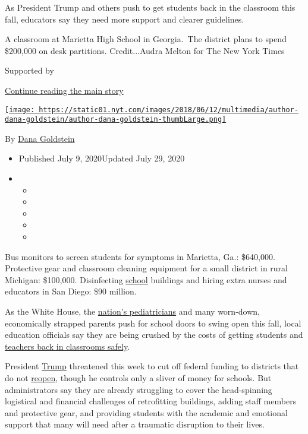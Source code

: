 As President Trump and others push to get students back in the classroom
this fall, educators say they need more support and clearer guidelines.

A classroom at Marietta High School in Georgia.~The district plans to
spend \$200,000 on desk partitions. Credit...Audra Melton for The New
York Times

Supported by

\protect\hyperlink{after-sponsor}{Continue reading the main story}

\href{https://www.nytimes.com/by/dana-goldstein}{\texttt{[image: https://static01.nyt.com/images/2018/06/12/multimedia/author-dana-goldstein/author-dana-goldstein-thumbLarge.png]}}

By \href{https://www.nytimes.com/by/dana-goldstein}{Dana Goldstein}

\begin{itemize}
\item
  Published July 9, 2020Updated July 29, 2020
\item
  \begin{itemize}
  \item
  \item
  \item
  \item
  \item
  \end{itemize}
\end{itemize}

Bus monitors to screen students for symptoms in Marietta, Ga.:
\$640,000. Protective gear and classroom cleaning equipment for a small
district in rural Michigan: \$100,000. Disinfecting
\href{https://www.nytimes.com/2020/07/10/us/politics/trump-schools-reopening.html}{school}
buildings and hiring extra nurses and educators in San Diego: \$90
million.

As the White House, the
\href{https://www.nytimes.com/2020/06/30/us/coronavirus-schools-reopening-guidelines-aap.html}{nation's
pediatricians} and many worn-down, economically strapped parents push
for school doors to swing open this fall, local education officials say
they are being crushed by the costs of getting students and
\href{https://www.nytimes.com/2020/07/11/us/virus-teachers-classrooms.html}{teachers
back in classrooms safely}.

President
\href{https://www.nytimes.com/2020/07/10/us/politics/trump-schools-reopening.html}{Trump}
threatened this week to cut off federal funding to districts that do not
\href{https://www.nytimes.com/2020/07/10/us/politics/trump-schools-reopening.html}{reopen},
though he controls only a sliver of money for schools. But
administrators say they are already struggling to cover the
head-spinning logistical and financial challenges of retrofitting
buildings, adding staff members and protective gear, and providing
students with the academic and emotional support that many will need
after a traumatic disruption to their lives.

